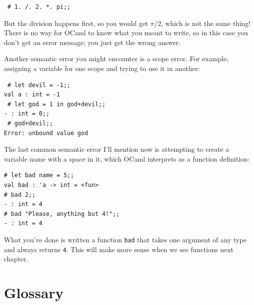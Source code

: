 \documentclass[10pt]{book}
\begin{document}
\beforeverb
\begin{verbatim}
 # 1. /. 2. *. pi;;
\end{verbatim}
\afterverb
%
But the division happens first, so you would get $\pi / 2$, which
is not the same thing!  There is no way for OCaml
to know what you meant to write, so in this case you don't
get an error message; you just get the wrong answer.


Another semantic error you might encounter is a scope error.
For example, assigning a variable for one scope and trying to use it
in another:

\beforeverb
\begin{verbatim}
 # let devil = -1;;
val a : int = -1
 # let god = 1 in god+devil;;
- : int = 0;;
 # god+devil;;
Error: unbound value god
\end{verbatim}
\afterverb

The last common semantic error I'll mention now is attempting to create
a variable name with a space in it, which OCaml interprets as a function
definition:

\beforeverb
\begin{verbatim}
# let bad name = 5;;
val bad : 'a -> int = <fun>
# bad 2;;
- : int = 4
# bad "Please, anything but 4!";;
- : int = 4
\end{verbatim}
\afterverb

What you've done is written a function {\tt bad} that takes one argument of 
any type and always returns {\tt 4}. This will make more sense when we see 
functions next chapter.

\section{Glossary}
\end{document}
